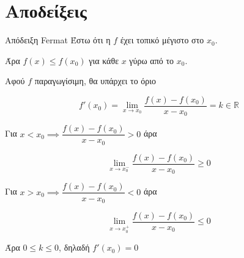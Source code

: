 \documentclass{presentation}
\begin{document}
\section{Αποδείξεις}
\begin{frame}[label=Απόδειξη1]{Απόδειξη Fermat}
   Έστω ότι η $f$ έχει τοπικό μέγιστο στο $x_0$.

  Άρα $f(x)\le f(x_0)$ για κάθε $x$ γύρω από το $x_0$.

   Αφού $f$ παραγωγίσιμη, θα υπάρχει το όριο

  $$f'(x_0)=\lim\limits_{x \to x_0}{ \dfrac{f(x)-f(x_0)}{x-x_0} }=k\in\mathbb{R}$$

   Για $x<x_0\implies \dfrac{f(x)-f(x_0)}{x-x_0} >0$ άρα

  $$\lim\limits_{x \to x_0^-}{ \dfrac{f(x)-f(x_0)}{x-x_0} }\ge 0$$

   Για $x>x_0\implies \dfrac{f(x)-f(x_0)}{x-x_0} <0$ άρα

  $$\lim\limits_{x \to x_0^+}{ \dfrac{f(x)-f(x_0)}{x-x_0} }\le 0$$

   Άρα $0\le k \le 0$, δηλαδή $f'(x_0)=0$ \hyperlink{Θεώρημα1}{}
\end{frame}
\end{document}
